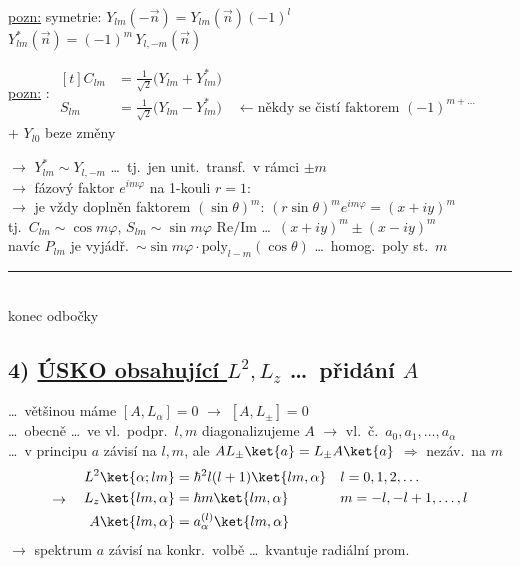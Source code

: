 \underline{pozn:} symetrie: \quad $Y_{lm}(-\vec n) = Y_{lm}(\vec n)(-1)^l$ \\
\hspace*{3.25cm} $Y_{lm}^*(\vec n) = (-1)^m\,Y_{l,-m}(\vec n)$ \quad
{}

\underline{pozn:} : \quad
$\begin{aligned}[t]
  C_{lm} &= \tfrac{1}{\sqrt2}\big(Y_{lm} + Y_{lm}^*\big) \\
  S_{lm} &= \tfrac{1}{\sqrt2}\big(Y_{lm} - Y_{lm}^*\big) \quad\leftarrow \text{někdy se čistí faktorem } (-1)^{m+\dots}
\end{aligned}$ \hfill {} \\
\quad + $Y_{l0}$ beze změny

$\to$ $Y_{lm}^* \sim Y_{l,-m}$ \dots\ tj.\ jen unit.\ transf.\ v rámci $\pm m$ \\
$\to$ fázový faktor $e^{im\varphi}$ na 1-kouli $r = 1$: \\
\quad $\to$ je vždy doplněn faktorem $(\sin\theta)^m$: \quad $(r\sin\theta)^m e^{im\varphi} = (x + iy)^m$ \\
tj.\ \quad $C_{lm}\sim\cos m\varphi$, \quad $S_{lm}\sim\sin m\varphi$ \quad $\mathrm{Re}/\mathrm{Im}$ \dots\ $(x+iy)^m \pm (x-iy)^m$ \\
navíc $P_{lm}$ je vyjádř.\ $\sim\sin m\varphi\cdot\mathrm{poly}_{l-m}(\cos\theta)$ \dots\ homog.\ poly st.\ $m$

{\color{prbarva}\rule{\linewidth}{0.6pt}}\\[-4pt]
\hfill{\color{prbarva}konec odbočky}

\subsection*{4) \underline{ÚSKO obsahující $L^2, L_z$} \dots\ přidání $A$}
\dots\ většinou máme $[A,L_\alpha] = 0$ \quad $\to$ \quad $[A,L_\pm] = 0$ \\
\dots\ obecně \dots\ ve vl.\ podpr.\ $l,m$ diagonalizujeme $A$ $\to$ vl.\ č.\ $a_0,a_1,\dots,a_\alpha$ \\
\dots\ v principu $a$ závisí na $l,m$, ale \quad $AL_\pm\ket{a} = L_\pm A\ket{a}$ $\Rightarrow$ nezáv.\ na $m$
\[
  \to\quad
  \begin{aligned}
    L^2\ket{\alpha;lm} &= \hbar^2 l(l+1)\ket{lm,\alpha} && l = 0,1,2,\dots \\
    L_z\ket{lm,\alpha} &= \hbar m\ket{lm,\alpha} && m = -l,-l+1,\dots,l \\
    A\ket{lm,\alpha} &= a_\alpha^{(l)}\ket{lm,\alpha}
  \end{aligned}
\]
$\to$ spektrum $a$ závisí na konkr.\ volbě \dots\ kvantuje radiální prom.

